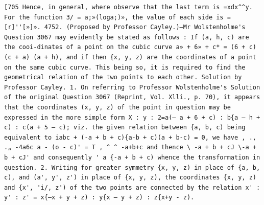 \documentclass[12pt]{article}
\theoremstyle{plain}
\begin{document}
\newpage
\setcounter{page}{592}
\begin{verbatim}
[705 Hence, in general, where observe that the last term is =xdx^^y. For the function 3/ = a;»(loga;)», the value of each side is =[r]''[»]». 4752. (Proposed by Professor Cayley.)—Mr Wolstenholme's Question 3067 may evidently be stated as follows : If (a, h, c) are the cooi-dinates of a point on the cubic curve a» + 6» + c* = (6 + c) (c + a) (a + h), and if then {x, y, z) are the coordinates of a point on the same cubic curve. This being so, it is required to find the geometrical relation of the two points to each other. Solution by Professor Cayley. 1. On referring to Professor Wolstenholme's Solution of the original Question 3067 (Reprint, Vol. Xlli., p. 70), it appears that the coordinates (x, y, z) of the point in question may be expressed in the more simple form X : y : 2=a(— a + 6 + c) : b{a — h + c) : c(a + 5 — c); viz. the given relation between {a, b, c) being equivalent to iabc + (-a + b + c){a-b + c)(a + b-c) = 0, we have , ., .„ -4a6c a - (o - c)' = T , ^ ^ -a+b+c and thence \ -a + b + cJ \-a + b + cJ' and consequently ' a {-a + b + c) whence the transformation in question. 2. Writing for greater symmetry {x, y, z) in place of {a, b, c), and (a', y', z') in place of {x, y, z), the coordinates {x, y, z) and {x', 'i/, z') of the two points are connected by the relation x' : y' : z' = x{—x + y + z) : y{x — y + z) : z{x+y - z). 
\end{verbatim}
\end{document}
